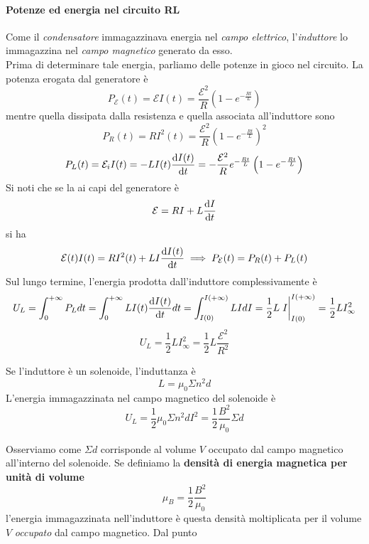 \paragraph{Potenze ed energia nel circuito RL}
Come il \textit{condensatore} immagazzinava energia nel \textit{campo elettrico}, l'\textit{induttore} lo immagazzina nel \textit{campo magnetico} generato da esso.\\
Prima di determinare tale energia, parliamo delle potenze in gioco nel circuito. La potenza erogata dal generatore è
\begin{equation}
	P_{\mathcal{E}}(t)=\mathcal{E}I(t)=\frac{\mathcal{E}^2}{R}\left(1-e^{-\frac{Rt}{L}}\right)
\end{equation}
mentre quella dissipata dalla resistenza e quella associata all'induttore sono
\begin{equation}
	P_{R}(t)=RI^2(t)=\frac{\mathcal{E}^2}{R}\left(1-e^{-\frac{Rt}{L}}\right)^2
\end{equation}
\begin{equation}
	P_{L}(t)=\mathcal{E}_iI(t)=-LI(t)\dv{I(t)}{t}=-\frac{\mathcal{E}^2}{R}e^{-\frac{Rt}{L}}\left(1-e^{-\frac{Rt}{L}}\right)
\end{equation}
Si noti che se la \ddp ai capi del generatore è
\begin{equation}
	\mathcal{E}=RI+L\dv{I}{t}
\end{equation}
si ha
\begin{equation*}
	\mathcal{E}(t)I(t)=RI^2(t)+LI\dv{I(t)}{t}\implies P_{\mathcal{E}}(t)=P_R(t)+P_L(t)
\end{equation*}
Sul lungo termine, l'energia prodotta dall'induttore complessivamente è
\begin{equation*}
	U_L=\int_0^{+\infty}P_Ldt=\int_0^{+\infty} LI(t)\dv{I(t)}{t}dt=\int_{I(0)}^{I(+\infty)}
	LIdI=\frac{1}{2}L\eval{I}_{I(0)}^{I(+\infty)}=\frac{1}{2}LI_{\infty}^2
\end{equation*}
\begin{equation}
	U_L=\frac{1}{2}L I_{\infty}^2=\frac{1}{2}L\frac{\mathcal{E}^2}{R^2}
\end{equation}
\begin{examplewt}[Solenoide]
	Se l'induttore è un solenoide, l'induttanza è
	\begin{equation*}
		L=\mu_0 \Sigma n^2 d
	\end{equation*}
	L'energia immagazzinata nel campo magnetico del solenoide è
	\begin{equation}
		U_L=\frac{1}{2}\mu_0\Sigma n^2 d  I^2=\frac{1}{2}\frac{B^2}{\mu_0}\Sigma d
	\end{equation}
\end{examplewt}
Osserviamo come $\Sigma d$ corrisponde al volume $V$ occupato dal campo magnetico all'interno del solenoide. Se definiamo la \textbf{densità di energia magnetica per unità di volume}
\begin{equation}\label{DensitàEnergiaMagnetica}
	\mu_{B}=\frac{1}{2}\frac{B^2}{\mu_0}
\end{equation}
l'energia immagazzinata nell'induttore è questa densità moltiplicata per il volume $V$ \textit{occupato} dal campo magnetico. Dal punto
